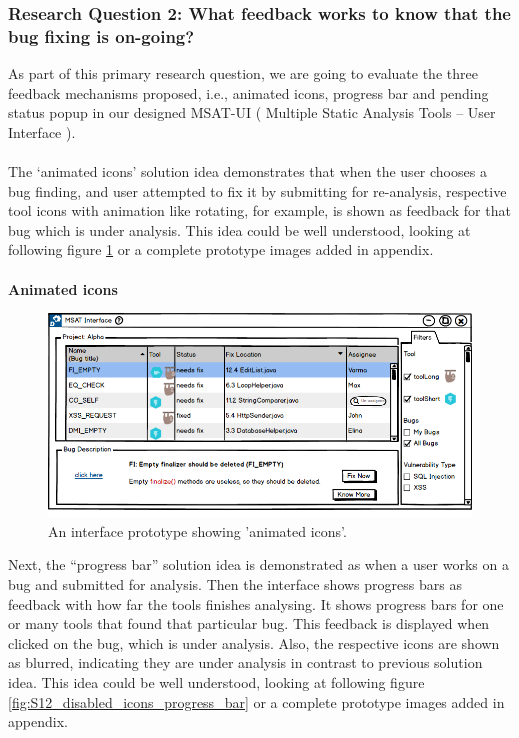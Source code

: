 \subsubsection{Research Question 2: What feedback works to know that the bug fixing is on-going?}

As part of this primary research question, we are going to evaluate the three feedback mechanisms proposed, i.e., animated icons, progress bar and pending status popup in our designed MSAT-UI ( Multiple Static Analysis Tools – User Interface ). \\ \\

The ‘animated icons’ solution idea demonstrates that when the user chooses a bug finding, and user attempted to fix it by submitting for re-analysis,  respective tool icons with animation like rotating, for example, is shown as feedback for that bug which is under analysis. This idea could be well understood, looking at following figure \ref{fig:S12_animated_icons} or a complete prototype images added in appendix. \\ \\

\textbf{Animated icons}
\begin{figure}[hbt!]
	\centering
	\includegraphics[width=\linewidth]{figures/solution_ideas_snaps/S12_animated_icons}
	\caption{An interface prototype showing 'animated icons'.}
	\label{fig:S12_animated_icons}
\end{figure}

Next, the “progress bar” solution idea is demonstrated as when a user works on a  bug and submitted for analysis.  Then the interface shows progress bars as feedback with how far the tools finishes analysing. It shows progress bars for one or many tools that found that particular bug. This feedback is displayed when clicked on the bug, which is under analysis. Also, the respective icons are shown as blurred, indicating they are under analysis in contrast to previous solution idea. This idea could be well understood, looking at following figure \ref{fig:S12_disabled_icons_progress_bar} or a complete prototype images added in appendix. \\ \\


